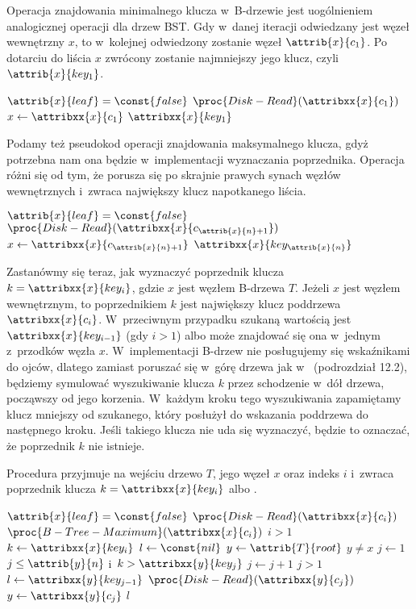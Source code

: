 
\exercise %
\exercise %
\exercise %
Operacja znajdowania minimalnego klucza w~B-drzewie jest uogólnieniem analogicznej operacji dla drzew BST.
Gdy w~danej iteracji odwiedzany jest węzeł wewnętrzny $x$, to w~kolejnej odwiedzony zostanie węzeł $\attrib{x}{c_1}$.
Po dotarciu do liścia $x$ zwrócony zostanie najmniejszy jego klucz, czyli $\attrib{x}{key_1}$.
\begin{codebox}
\li	\While $\attrib{x}{leaf}=\const{false}$
\li		\Do $\proc{Disk-Read}(\attribxx{x}{c_1})$
\li     $x\gets\attribxx{x}{c_1}$
		\End
\li	\Return $\attribxx{x}{key_1}$
\end{codebox}

Podamy też pseudokod operacji znajdowania maksymalnego klucza, gdyż potrzebna nam ona będzie w~implementacji wyznaczania poprzednika.
Operacja różni się od  tym, że porusza się po skrajnie prawych synach węzłów wewnętrznych i~zwraca największy klucz napotkanego liścia.
\begin{codebox}
\li	\While $\attrib{x}{leaf}=\const{false}$
\li		\Do $\proc{Disk-Read}(\attribxx{x}{c_{\attrib{x}{n}+1}})$
\li     $x\gets\attribxx{x}{c_{\attrib{x}{n}+1}}$
		\End
\li	\Return $\attribxx{x}{key_{\attrib{x}{n}}}$
\end{codebox}

Zastanówmy się teraz, jak wyznaczyć poprzednik klucza $k=\attribxx{x}{key_i}$, gdzie $x$ jest węzłem B-drzewa $T$.
Jeżeli $x$ jest węzłem wewnętrznym, to poprzednikiem $k$ jest największy klucz poddrzewa $\attribxx{x}{c_i}$.
W~przeciwnym przypadku szukaną wartością jest $\attribxx{x}{key_{i-1}}$ (gdy $i>1$) albo może znajdować się ona w~jednym z~przodków węzła $x$.
W~implementacji B-drzew nie posługujemy się wskaźnikami do ojców, dlatego zamiast poruszać się w~górę drzewa jak w~ (podrozdział 12.2), będziemy symulować wyszukiwanie klucza $k$ przez schodzenie w~dół drzewa, począwszy od jego korzenia.
W~każdym kroku tego wyszukiwania zapamiętamy klucz mniejszy od szukanego, który posłużył do wskazania poddrzewa do następnego kroku.
Jeśli takiego klucza nie uda się wyznaczyć, będzie to oznaczać, że poprzednik $k$ nie istnieje.

Procedura przyjmuje na wejściu drzewo $T$, jego węzeł $x$ oraz indeks $i$ i~zwraca poprzednik klucza $k=\attribxx{x}{key_i}$ albo .
\begin{codebox}
\li \If $\attrib{x}{leaf}=\const{false}$
\li   \Then $\proc{Disk-Read}(\attribxx{x}{c_i})$
\li     \Return $\proc{B-Tree-Maximum}(\attribxx{x}{c_i})$
    \End
\li \If $i>1$
\li   \Then \Return {}
    \End
\li $k\gets\attribxx{x}{key_i}$
\li $l\gets\const{nil}$
\li $y\gets\attrib{T}{root}$
\li \While $y\ne x$
\li   \Do $j\gets1$
\li   \While $j\le\attrib{y}{n}$ i~$k>\attribxx{y}{key_j}$
\li     \Do $j\gets j+1$
      \End
\li   \If $j>1$
\li     \Then $l\gets\attribxx{y}{key_{j-1}}$
      \End
\li   $\proc{Disk-Read}(\attribxx{y}{c_j})$
\li   $y\gets\attribxx{y}{c_j}$
    \End
\li \Return $l$
\end{codebox}

